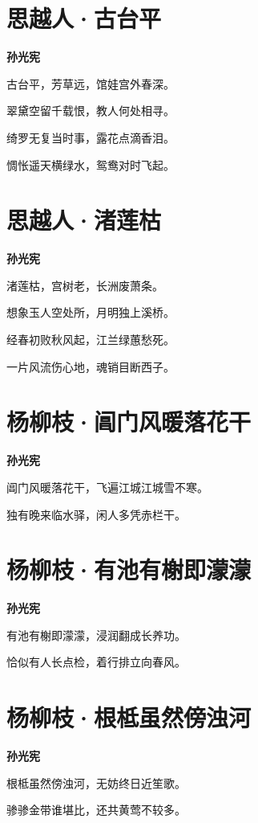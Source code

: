 \documentclass[12pt,a4paper]{ctexbook}
\begin{document}
\section{思越人·古台平}
\textbf{孙光宪}\par\vspace{0.5em}
古台平，芳草远，馆娃宫外春深。\par
翠黛空留千载恨，教人何处相寻。\par
绮罗无复当时事，露花点滴香泪。\par
惆怅遥天横绿水，鸳鸯对时飞起。\par

\section{思越人·渚莲枯}
\textbf{孙光宪}\par\vspace{0.5em}
渚莲枯，宫树老，长洲废萧条。\par
想象玉人空处所，月明独上溪桥。\par
经春初败秋风起，江兰绿蕙愁死。\par
一片风流伤心地，魂销目断西子。\par

\section{杨柳枝·阊门风暖落花干}
\textbf{孙光宪}\par\vspace{0.5em}
阊门风暖落花干，飞遍江城江城雪不寒。\par
独有晚来临水驿，闲人多凭赤栏干。\par

\section{杨柳枝·有池有榭即濛濛}
\textbf{孙光宪}\par\vspace{0.5em}
有池有榭即濛濛，浸润翻成长养功。\par
恰似有人长点检，着行排立向春风。\par

\section{杨柳枝·根柢虽然傍浊河}
\textbf{孙光宪}\par\vspace{0.5em}
根柢虽然傍浊河，无妨终日近笙歌。\par
骖骖金带谁堪比，还共黄莺不较多。\par
\end{document}
